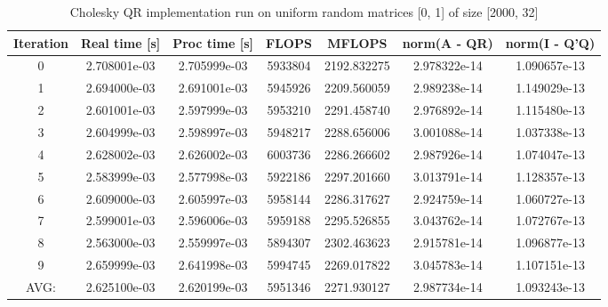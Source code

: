 \documentclass[11pt]{article}
\begin{document}
\begin{table}
  \centering

  \caption{Cholesky QR implementation run on uniform random matrices [0, 1] of size [2000, 32]}
  \vspace{3mm}

  \label{tab:chol_qr_2000}

  \begin{tabular}{c c c c c c c}
    Iteration & Real time [s] & Proc time [s] & FLOPS & MFLOPS & norm(A - QR) & norm(I - Q'Q) \\ \hline
    0 & 2.708001e-03 & 2.705999e-03 & 5933804 & 2192.832275 & 2.978322e-14 & 1.090657e-13 \\
    1 & 2.694000e-03 & 2.691001e-03 & 5945926 & 2209.560059 & 2.989238e-14 & 1.149029e-13 \\
    2 & 2.601001e-03 & 2.597999e-03 & 5953210 & 2291.458740 & 2.976892e-14 & 1.115480e-13 \\
    3 & 2.604999e-03 & 2.598997e-03 & 5948217 & 2288.656006 & 3.001088e-14 & 1.037338e-13 \\
    4 & 2.628002e-03 & 2.626002e-03 & 6003736 & 2286.266602 & 2.987926e-14 & 1.074047e-13 \\
    5 & 2.583999e-03 & 2.577998e-03 & 5922186 & 2297.201660 & 3.013791e-14 & 1.128357e-13 \\
    6 & 2.609000e-03 & 2.605997e-03 & 5958144 & 2286.317627 & 2.924759e-14 & 1.060727e-13 \\
    7 & 2.599001e-03 & 2.596006e-03 & 5959188 & 2295.526855 & 3.043762e-14 & 1.072767e-13 \\
    8 & 2.563000e-03 & 2.559997e-03 & 5894307 & 2302.463623 & 2.915781e-14 & 1.096877e-13 \\
    9 & 2.659999e-03 & 2.641998e-03 & 5994745 & 2269.017822 & 3.045783e-14 & 1.107151e-13 \\ \hline
    AVG: & 2.625100e-03 & 2.620199e-03 & 5951346 & 2271.930127 & 2.987734e-14 & 1.093243e-13 
  \end{tabular}
\end{table}
\end{document}
